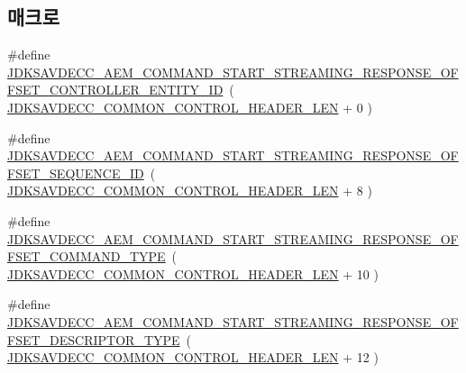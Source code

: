 \subsection*{매크로}
\begin{DoxyCompactItemize}
\item 
\#define \hyperlink{group__command__start__streaming__response_ga6bf6c059a92fa2a49b6ffa30a2cfd6b8}{J\+D\+K\+S\+A\+V\+D\+E\+C\+C\+\_\+\+A\+E\+M\+\_\+\+C\+O\+M\+M\+A\+N\+D\+\_\+\+S\+T\+A\+R\+T\+\_\+\+S\+T\+R\+E\+A\+M\+I\+N\+G\+\_\+\+R\+E\+S\+P\+O\+N\+S\+E\+\_\+\+O\+F\+F\+S\+E\+T\+\_\+\+C\+O\+N\+T\+R\+O\+L\+L\+E\+R\+\_\+\+E\+N\+T\+I\+T\+Y\+\_\+\+ID}~( \hyperlink{group__jdksavdecc__avtp__common__control__header_gaae84052886fb1bb42f3bc5f85b741dff}{J\+D\+K\+S\+A\+V\+D\+E\+C\+C\+\_\+\+C\+O\+M\+M\+O\+N\+\_\+\+C\+O\+N\+T\+R\+O\+L\+\_\+\+H\+E\+A\+D\+E\+R\+\_\+\+L\+EN} + 0 )
\item 
\#define \hyperlink{group__command__start__streaming__response_ga4deedbe8525c5d6098ec9d66c211c9c1}{J\+D\+K\+S\+A\+V\+D\+E\+C\+C\+\_\+\+A\+E\+M\+\_\+\+C\+O\+M\+M\+A\+N\+D\+\_\+\+S\+T\+A\+R\+T\+\_\+\+S\+T\+R\+E\+A\+M\+I\+N\+G\+\_\+\+R\+E\+S\+P\+O\+N\+S\+E\+\_\+\+O\+F\+F\+S\+E\+T\+\_\+\+S\+E\+Q\+U\+E\+N\+C\+E\+\_\+\+ID}~( \hyperlink{group__jdksavdecc__avtp__common__control__header_gaae84052886fb1bb42f3bc5f85b741dff}{J\+D\+K\+S\+A\+V\+D\+E\+C\+C\+\_\+\+C\+O\+M\+M\+O\+N\+\_\+\+C\+O\+N\+T\+R\+O\+L\+\_\+\+H\+E\+A\+D\+E\+R\+\_\+\+L\+EN} + 8 )
\item 
\#define \hyperlink{group__command__start__streaming__response_ga0746d7b6b49f16f744839ece0e0ade6e}{J\+D\+K\+S\+A\+V\+D\+E\+C\+C\+\_\+\+A\+E\+M\+\_\+\+C\+O\+M\+M\+A\+N\+D\+\_\+\+S\+T\+A\+R\+T\+\_\+\+S\+T\+R\+E\+A\+M\+I\+N\+G\+\_\+\+R\+E\+S\+P\+O\+N\+S\+E\+\_\+\+O\+F\+F\+S\+E\+T\+\_\+\+C\+O\+M\+M\+A\+N\+D\+\_\+\+T\+Y\+PE}~( \hyperlink{group__jdksavdecc__avtp__common__control__header_gaae84052886fb1bb42f3bc5f85b741dff}{J\+D\+K\+S\+A\+V\+D\+E\+C\+C\+\_\+\+C\+O\+M\+M\+O\+N\+\_\+\+C\+O\+N\+T\+R\+O\+L\+\_\+\+H\+E\+A\+D\+E\+R\+\_\+\+L\+EN} + 10 )
\item 
\#define \hyperlink{group__command__start__streaming__response_ga86e1398a8b7e36d5efb1be8402190fac}{J\+D\+K\+S\+A\+V\+D\+E\+C\+C\+\_\+\+A\+E\+M\+\_\+\+C\+O\+M\+M\+A\+N\+D\+\_\+\+S\+T\+A\+R\+T\+\_\+\+S\+T\+R\+E\+A\+M\+I\+N\+G\+\_\+\+R\+E\+S\+P\+O\+N\+S\+E\+\_\+\+O\+F\+F\+S\+E\+T\+\_\+\+D\+E\+S\+C\+R\+I\+P\+T\+O\+R\+\_\+\+T\+Y\+PE}~( \hyperlink{group__jdksavdecc__avtp__common__control__header_gaae84052886fb1bb42f3bc5f85b741dff}{J\+D\+K\+S\+A\+V\+D\+E\+C\+C\+\_\+\+C\+O\+M\+M\+O\+N\+\_\+\+C\+O\+N\+T\+R\+O\+L\+\_\+\+H\+E\+A\+D\+E\+R\+\_\+\+L\+EN} + 12 )

\end{DoxyCompactItemize}
